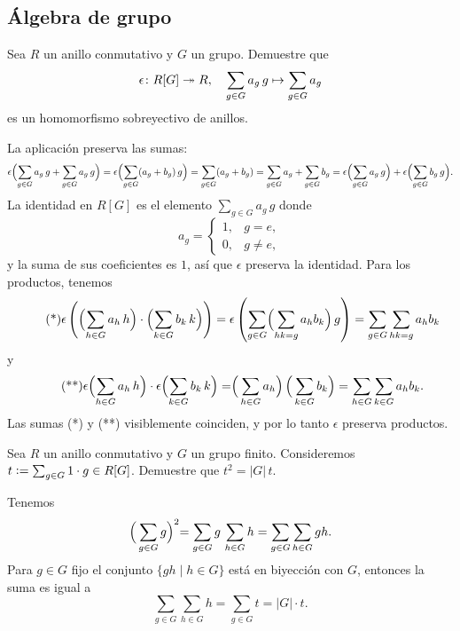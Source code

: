\subsection*{Álgebra de grupo}

\begin{ejercicio}
  Sea $R$ un anillo conmutativo y $G$ un grupo. Demuestre que
  $$\epsilon\colon R [G] \twoheadrightarrow R, \quad \sum_{g\in G} a_g\,g \mapsto \sum_{g\in G} a_g$$
  es un homomorfismo sobreyectivo de anillos.

  \ifdefined\solutions
  \begin{solucion}
    La aplicación preserva las sumas:
    \[ \epsilon \Bigl(\sum_{g\in G} a_g\,g + \sum_{g\in G} a_g\,g\Bigr) =
       \epsilon \Bigl(\sum_{g\in G} (a_g + b_g)\,g\Bigr) =
       \sum_{g\in G} (a_g + b_g) =
       \sum_{g\in G} a_g + \sum_{g\in G} b_g =
       \epsilon \Bigl(\sum_{g\in G} a_g\,g\Bigr) +
       \epsilon \Bigl(\sum_{g\in G} b_g\,g\Bigr). \]
    La identidad en $R [G]$ es el elemento $\sum_{g\in G} a_g\,g$ donde
    $$a_g = \begin{cases}
      1, & g = e,\\
      0, & g \ne e,
    \end{cases}$$
    y la suma de sus coeficientes es $1$, así que $\epsilon$ preserva
    la identidad. Para los productos, tenemos
    \begin{equation}
      \tag{*}
      \epsilon \left(\Bigl(\sum_{h\in G} a_h\,h\Bigr) \cdot
        \Bigl(\sum_{k\in G} b_k\,k\Bigr)\right) =
      \epsilon \left(\sum_{g\in G} \Bigl(\sum_{hk = g} a_h b_k\Bigr)\,g\right) =
      \sum_{g\in G} \sum_{hk = g} a_h b_k
    \end{equation}
    y
    \begin{equation}
      \tag{**}
      \epsilon \Bigl(\sum_{h\in G} a_h\,h\Bigr) \cdot
      \epsilon \Bigl(\sum_{k\in G} b_k\,k\Bigr) =
      \Bigr(\sum_{h\in G} a_h\Bigr)\,\Bigr(\sum_{k\in G} b_k\Bigr) =
      \sum_{h\in G}\sum_{k\in G} a_h b_k.
    \end{equation}
    Las sumas (*) y (**) visiblemente coinciden, y por lo tanto $\epsilon$
    preserva productos.
  \end{solucion}
  \fi
\end{ejercicio}

\begin{ejercicio}
  \label{ejerc:cuadrado-del-elemento-de-la-traza}
  Sea $R$ un anillo conmutativo y $G$ un grupo finito. Consideremos
  $t \mathrel{\mathop:}= \sum_{g\in G} 1\cdot g \in R [G]$. Demuestre que $t^2 = |G|\,t$.

  \ifdefined\solutions
  \begin{solucion}
    Tenemos
    $$\Bigr(\sum_{g\in G} g\Bigl)^2 = \sum_{g\in G} g\,\sum_{h\in G} h = \sum_{g\in G} \sum_{h\in G} gh.$$
    Para $g\in G$ fijo el conjunto $\{ gh \mid h\in G \}$ está en biyección con
    $G$, entonces la suma es igual a
    $$\sum_{g\in G} \sum_{h\in G} h = \sum_{g\in G} t = |G|\cdot t.$$
  \end{solucion}
  \fi
\end{ejercicio}

